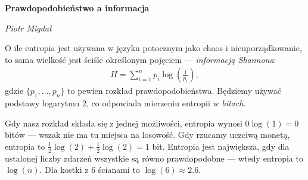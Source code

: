 \documentclass[10pt,a4paper]{article}
\begin{document}
\noindent\textbf{\LARGE Prawdopodobieństwo a informacja}

\medskip
\noindent\textit{\Large Piotr Migdał}

\medskip

O ile entropia jest używana w języku potocznym jako chaos i nieuporządkowanie, to sama wielkość jest ściśle określonym pojęciem --- \emph{informacją Shannona}:
%
%
\begin{align}
    H = \sum_{i=1}^{n} p_i \log \left(\tfrac{1}{p_i} \right),\label{eq:entropia}
\end{align}
%
%
gdzie $\{p_1, \ldots, p_n\}$ to pewien rozkład prawdopodobieństwa. Będziemy używać podstawy logarytmu $2$, co odpowiada mierzeniu entropii w \emph{bitach}. 

Gdy nasz rozkład składa się z jednej możliwości, entropia wynosi $0 \log(1) = 0$ bitów --- wszak nie ma tu miejsca na losowość.
Gdy rzucamy uczciwą monetą, entropia to $\tfrac{1}{2} \log(2) + \tfrac{1}{2} \log(2) = 1$ bit.
Entropia jest największa, gdy dla ustalonej liczby zdarzeń wszystkie są równo prawdopodobne --- wtedy entropia to $\log(n)$.
Dla kostki z $6$ ścianami to $\log(6)\approx 2.6$. 

\end{document}
